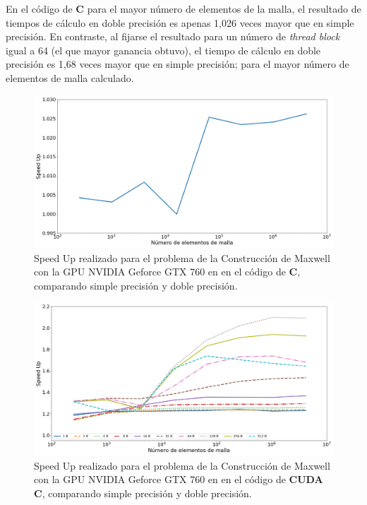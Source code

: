 En el código de \textbf{C} para el mayor número de elementos de la malla, el resultado de tiempos de cálculo en doble precisión es apenas 1,026 veces mayor que en  simple precisión. En contraste, al fijarse el resultado para un número de \textit{thread block} igual a 64 (el que mayor ganancia obtuvo), el tiempo de cálculo en doble precisión es 1,68 veces mayor que en simple precisión; para el mayor número de elementos de malla calculado.

\begin{figure}[h!]
	\centering
	\includegraphics[width=\textwidth]{figs/cap4/c_760_MxC_c_10}
	\caption{Speed Up realizado para el problema de la Construcción de Maxwell con la GPU NVIDIA Geforce GTX 760 en en el código de \textbf{C}, comparando simple precisión y doble precisión.} 
	\label{fig:c_760_MxC_c_10}	
\end{figure}

\begin{figure}[h!]
	\centering
	\includegraphics[width=\textwidth]{figs/cap4/c_760_MxC_cuda_10}
	\caption{Speed Up realizado para el problema de la Construcción de Maxwell con la GPU NVIDIA Geforce GTX 760 en en el código de \textbf{CUDA C}, comparando simple precisión y doble precisión.} 
	\label{fig:c_760_MxC_cuda_10}	
\end{figure}

